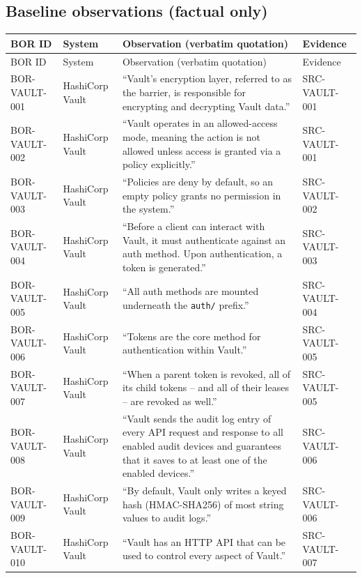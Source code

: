 \documentclass{article}
\begin{document}
\subsection*{Baseline observations (factual only)}
\begin{longtable}{@{}p{}p{}p{}p{}@{}}
\toprule
BOR ID & System & Observation (verbatim quotation) & Evidence\\
\midrule
\endfirsthead
\toprule
BOR ID & System & Observation (verbatim quotation) & Evidence\\
\midrule
\endhead
BOR-VAULT-001 & HashiCorp Vault & ``Vault’s encryption layer, referred to as the barrier, is responsible for encrypting and decrypting Vault data.'' & SRC-VAULT-001\\
BOR-VAULT-002 & HashiCorp Vault & ``Vault operates in an allowed-access mode, meaning the action is not allowed unless access is granted via a policy explicitly.'' & SRC-VAULT-001\\
BOR-VAULT-003 & HashiCorp Vault & ``Policies are deny by default, so an empty policy grants no permission in the system.'' & SRC-VAULT-002\\
BOR-VAULT-004 & HashiCorp Vault & ``Before a client can interact with Vault, it must authenticate against an auth method. Upon authentication, a token is generated.'' & SRC-VAULT-003\\
BOR-VAULT-005 & HashiCorp Vault & ``All auth methods are mounted underneath the \texttt{auth/} prefix.'' & SRC-VAULT-004\\
BOR-VAULT-006 & HashiCorp Vault & ``Tokens are the core method for authentication within Vault.'' & SRC-VAULT-005\\
BOR-VAULT-007 & HashiCorp Vault & ``When a parent token is revoked, all of its child tokens -- and all of their leases -- are revoked as well.'' & SRC-VAULT-005\\
BOR-VAULT-008 & HashiCorp Vault & ``Vault sends the audit log entry of every API request and response to all enabled audit devices and guarantees that it saves to at least one of the enabled devices.'' & SRC-VAULT-006\\
BOR-VAULT-009 & HashiCorp Vault & ``By default, Vault only writes a keyed hash (HMAC-SHA256) of most string values to audit logs.'' & SRC-VAULT-006\\
BOR-VAULT-010 & HashiCorp Vault & ``Vault has an HTTP API that can be used to control every aspect of Vault.'' & SRC-VAULT-007\\
\bottomrule
\end{longtable}
\newpage
\end{document}
